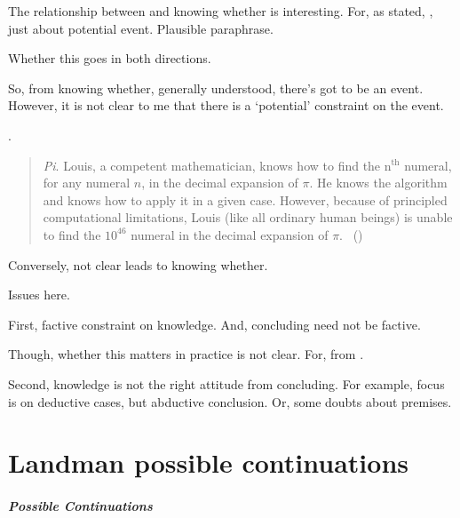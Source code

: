 \begin{note}
  The relationship between  and knowing whether is interesting.
  For, as stated, , just about potential event.
  Plausible paraphrase.

  Whether this goes in both directions.

  So, from knowing whether, generally understood, there's got to be an event.
  However, it is not clear to me that there is a `potential' constraint on the event.

  \cite{Bengson:2011th}.
  \begin{quote}
    \emph{Pi}.
    Louis, a competent mathematician, knows how to find the n\(^{\text{th}}\) numeral, for any numeral \(n\), in the decimal expansion of \(\pi\).
    He knows the algorithm and knows how to apply it in a given case.
    However, because of principled computational limitations, Louis (like all ordinary human beings) is unable to find the \(10^{46}\) numeral in the decimal expansion of \(\pi\).%
    \mbox{ }\hfill\mbox{(\citeyear[170]{Bengson:2011th})}
  \end{quote}

  Conversely, not clear  leads to knowing whether.

  Issues here.

  First, factive constraint on knowledge.
  And, concluding need not be factive.

  Though, whether this matters in practice is not clear.
  For, from \agpe{}.

  Second, knowledge is not the right attitude from concluding.
  For example, focus is on deductive cases, but abductive conclusion.
  Or, some doubts about premises.
\end{note}


\section{Landman possible continuations}
\label{sec:landm-poss-cont}

\subparagraph{Possible Continuations}

